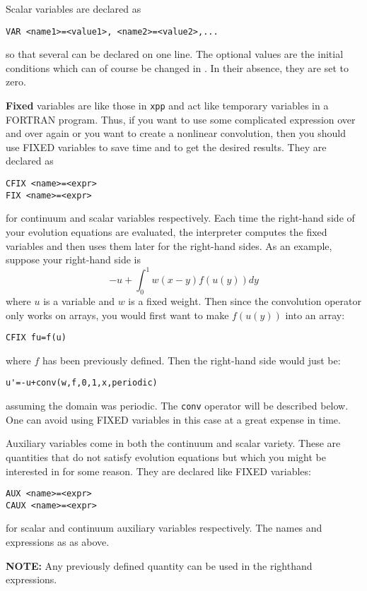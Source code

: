 Scalar variables are declared as
\begin{verbatim}
VAR <name1>=<value1>, <name2>=<value2>,...
\end{verbatim}
so that several can be declared on one line. The optional values are
the initial conditions which can of course be changed in \xtc.  In
their absence, they are set to zero.

{\bf Fixed} variables are like those in {\tt xpp} and act like
temporary variables in a FORTRAN program.  Thus, if you want to use
some complicated expression over and over again or you want to create
a nonlinear convolution, then you should use FIXED variables to save
time and to get the desired results. They are declared as
\begin{verbatim}
CFIX <name>=<expr>
FIX <name>=<expr>
\end{verbatim}
for continuum and scalar variables respectively.  Each time the
right-hand side of your evolution equations are evaluated, the
interpreter computes the fixed variables and then uses them later for
the right-hand sides. As an example, suppose your right-hand side is
\[
 -u+ \int_0^1 w(x-y)f(u(y))dy
\]
where $u$ is a variable and $w$ is a fixed weight.  Then since the
convolution operator only works on arrays, you would first want to
make $f(u(y))$ into an array:
\begin{verbatim}
CFIX fu=f(u)
\end{verbatim}
where $f$ has been previously defined.  Then the right-hand side would
just be:
\begin{verbatim}
u'=-u+conv(w,f,0,1,x,periodic)
\end{verbatim}
assuming the domain was periodic.  The {\tt conv} operator will be
described below.  One can avoid using FIXED variables in this case at
a great expense in time.

Auxiliary variables come in both the continuum and scalar variety.
These are quantities that do not satisfy evolution equations but which
you might be interested in for some reason. They are declared like
FIXED variables:
\begin{verbatim}
AUX <name>=<expr>
CAUX <name>=<expr>  
\end{verbatim}
for scalar and continuum auxiliary variables respectively.  The names
and expressions as as above.  

{\bf NOTE:} Any previously defined quantity can be used in the
righthand expressions.

